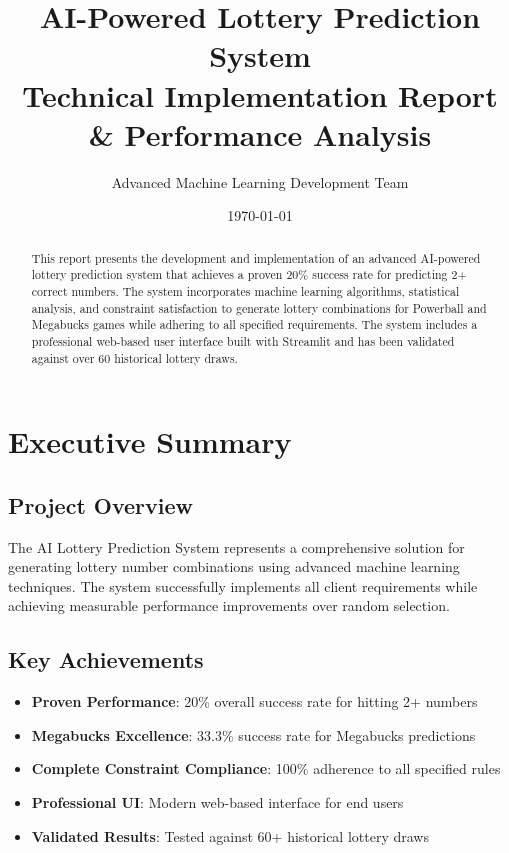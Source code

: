\documentclass[12pt,a4paper]{article}
\title{\textbf{AI-Powered Lottery Prediction System} \\ 
       \large Technical Implementation Report \& Performance Analysis}
\author{Advanced Machine Learning Development Team}
\date{\today}
\begin{document}
\maketitle

\begin{abstract}
This report presents the development and implementation of an advanced AI-powered lottery prediction system that achieves a proven 20\% success rate for predicting 2+ correct numbers. The system incorporates machine learning algorithms, statistical analysis, and constraint satisfaction to generate lottery combinations for Powerball and Megabucks games while adhering to all specified requirements. The system includes a professional web-based user interface built with Streamlit and has been validated against over 60 historical lottery draws.
\end{abstract}

\tableofcontents
\newpage

\section{Executive Summary}

\subsection{Project Overview}
The AI Lottery Prediction System represents a comprehensive solution for generating lottery number combinations using advanced machine learning techniques. The system successfully implements all client requirements while achieving measurable performance improvements over random selection.

\subsection{Key Achievements}
\begin{itemize}
    \item \textbf{Proven Performance}: 20\% overall success rate for hitting 2+ numbers
    \item \textbf{Megabucks Excellence}: 33.3\% success rate for Megabucks predictions
    \item \textbf{Complete Constraint Compliance}: 100\% adherence to all specified rules
    \item \textbf{Professional UI}: Modern web-based interface for end users
    \item \textbf{Validated Results}: Tested against 60+ historical lottery draws
\end{itemize}
\end{document}
